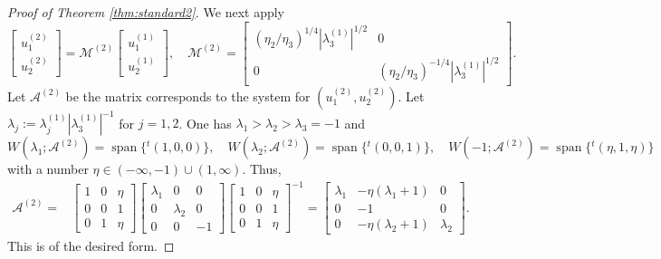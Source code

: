 \documentclass[11pt,a4paper,twosides]{amsart}
\theoremstyle{plain}
\theoremstyle{remark}
\numberwithin{equation}{section}
\DeclareMathOperator{\Span}{span}
\theoremstyle{definition}
\newcommand{\1}{{\bf 1}_{\{|x| < |t|\}}}
\begin{document}
\begin{proof}[Proof of Theorem \ref{thm:standard2}]
We next apply
\[
	\begin{bmatrix}
	u_1^{(2)}\\
	u_2^{(2)}
	\end{bmatrix}
	=
	\mathscr{M}^{(2)}
	\begin{bmatrix}
	u_1^{(1)}\\
	u_2^{(1)}
	\end{bmatrix}, \quad
	\mathscr{M}^{(2)}=\begin{bmatrix}
	(\eta_2/\eta_3)^{1/4} |\lambda_3^{(1)}|^{1/2} & 0 \\
	0 & (\eta_2/\eta_3)^{-1/4} |\lambda_3^{(1)}|^{1/2}
	\end{bmatrix}.
\]
Let $\mathscr{A}^{(2)}$ be the matrix corresponds to the system for $(u_1^{(2)},u_2^{(2)})$. 
Let $\lambda_j:= \lambda_j^{(1)}
|\lambda_3^{(1)}|^{-1}$ for $j=1,2$.
One has $\lambda_1>\lambda_2>\lambda_3=-1$ and
\[
	W(\lambda_1;\mathscr{A}^{(2)}) = \Span\{{}^t\!(1,0,0)\}, \quad
	W(\lambda_2;\mathscr{A}^{(2)}) = \Span\{{}^t\!(0,0,1)\}, \quad
	W(-1;\mathscr{A}^{(2)}) = \Span\{{}^t\!(\eta,1,\eta)\}
\]
with a number $\eta\in (-\infty,-1)\cup (1,\infty)$. 
Thus,
\begin{align*}
	\mathscr{A}^{(2)}
	={}& \begin{bmatrix}
	1 & 0 & \eta \\
	0 & 0& 1\\
	0 & 1& \eta
	\end{bmatrix}
	\begin{bmatrix}
	\lambda_1 & 0 & 0 \\
	0 & \lambda_2 & 0\\
	0 & 0 & -1
	\end{bmatrix}
	\begin{bmatrix}
	1 & 0 & \eta \\
	0 & 0& 1\\
	0 & 1& \eta
	\end{bmatrix}^{-1} 
	= \begin{bmatrix}
	\lambda_1 & 
	-\eta(\lambda_1+1) 
	& 0 \\
	0 & -1& 0\\
	0 & -\eta(\lambda_2+1)  & \lambda_2
	\end{bmatrix}.
\end{align*}
This is of the desired form.


\end{proof}
\end{document}
